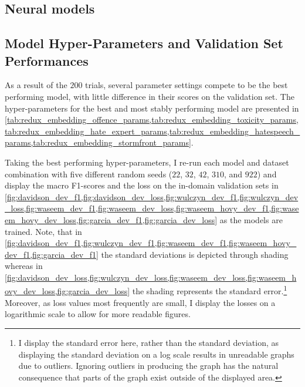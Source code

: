 \subsection{Neural models}
\subsection{Model Hyper-Parameters and Validation Set Performances}

As a result of the $200$ trials, several parameter settings compete to be the best performing model, with little difference in their scores on the validation set. 
The hyper-parameters for the best and most stably performing model are presented in \cref{tab:redux_embedding_offence_params,tab:redux_embedding_toxicity_params,tab:redux_embedding_hate_expert_params,tab:redux_embedding_hatespeech_params,tab:redux_embedding_stormfront_params}.

Taking the best performing hyper-parameters, I re-run each model and dataset combination with five different random seeds ($22$, $32$, $42$, $310$, and $922$) and display the macro F1-scores and the loss on the in-domain validation sets in \cref{fig:davidson_dev_f1,fig:davidson_dev_loss,fig:wulczyn_dev_f1,fig:wulczyn_dev_loss,fig:waseem_dev_f1,fig:waseem_dev_loss,fig:waseem_hovy_dev_f1,fig:waseem_hovy_dev_loss,fig:garcia_dev_f1,fig:garcia_dev_loss} as the models are trained.
Note, that in \cref{fig:davidson_dev_f1,fig:wulczyn_dev_f1,fig:waseem_dev_f1,fig:waseem_hovy_dev_f1,fig:garcia_dev_f1} the standard deviations is depicted through shading whereas in \cref{fig:davidson_dev_loss,fig:wulczyn_dev_loss,fig:waseem_dev_loss,fig:waseem_hovy_dev_loss,fig:garcia_dev_loss} the shading represents the standard error.\footnote{I display the standard error here, rather than the standard deviation, as displaying the standard deviation on a log scale results in unreadable graphs due to outliers. Ignoring outliers in producing the graph has the natural consequence that parts of the graph exist outside of the displayed area.}
Moreover, as loss values most frequently are small, I display the losses on a  logarithmic scale to allow for more readable figures.

